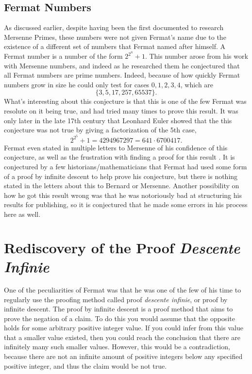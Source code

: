 \documentclass[11pt]{article}
\begin{document}
\subsection*{Fermat Numbers}
As discussed earlier, despite having been the first documented to research 
Mersenne Primes, these numbers were not given Fermat's name due to the existence
of a different set of numbers that Fermat named after himself.
A Fermat number is a number of the form $2^{2^n} +1$.
This number arose from his work with Mersenne numbers, and indeed as he
researched them he conjectured that all Fermat numbers are prime numbers.
Indeed, because of how quickly Fermat numbers grow in size he could only
test for cases $0,1,2,3,4$, which are
    \[\{3, 5, 17, 257, 65537\}. \]
What's interesting about this conjecture is that this is one of the few Fermat
was resolute on it being true, and had tried many times to prove this result.
It was only later in the late 17th century that Leonhard Euler showed that the
this conjecture was not true by giving a factorization of the 5th case,
    \[2^{2^5}+1 = 4294967297 = 641 \cdot 6700417. \]
Fermat even stated in multiple letters to Mersenne of his confidence of this
conjecture, as well as the frustration with finding a proof for
this result \cite{Mahoney, Ball}.
It is conjectured by a few historians/mathematicians that Fermat had used some
form of a proof by infinite descent to help prove his conjecture, but there is
nothing stated in the letters about this to Bernard or Mersenne.
Another possibility on how he got this result wrong was that he was notoriously
bad at structuring his results for publishing, so it is conjectured
that he made some errors in his process here as well.

\section*{Rediscovery of the Proof \emph{Descente Infinie}}
One of the peculiarities of Fermat was that he was one of the few of his time
to regularly use the proofing method called proof \emph{descente infinie}, or
proof by infinite descent.
The proof by infinite descent is a proof method that aims to prove the negation
of a claim.
To do this you would assume that the opposite holds for some arbitrary
positive integer value.
If you could infer from this value that a smaller value existed, then you could
reach the conclusion that there are infinitely many such smaller values.
However, this would be a contradiction, because there are not an infinite amount
of positive integers below any specified positive integer, and thus the claim
would be not true.
\end{document}

